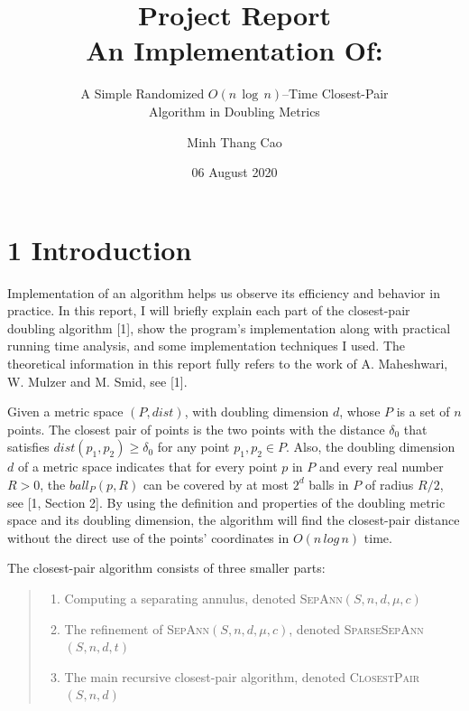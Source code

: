 \documentclass[12pt,english,]{article}
\title{\textbf{Project Report}\\
\Large{An Implementation Of:}}
\subtitle{A Simple Randomized \(O(n\,\log\, n)\)--Time Closest-Pair\\
Algorithm in Doubling Metrics}
\author{Minh Thang Cao}
\date{06 August 2020}
\begin{document}
\maketitle

\hypertarget{section1}{%
\section{\texorpdfstring{1
\enspace Introduction}{1 Introduction}}\label{section1}}

Implementation of an algorithm helps us observe its efficiency and
behavior in practice. In this report, I will briefly explain each part
of the closest-pair doubling algorithm {[}1{]}, show the program's
implementation along with practical running time analysis, and some
implementation techniques I used. The theoretical information in this
report fully refers to the work of A. Maheshwari, W. Mulzer and M. Smid,
see {[}1{]}.

Given a metric space \((P,dist)\), with doubling dimension \(d\), whose
\(P\) is a set of \(n\) points. The closest pair of points is the two
points with the distance \(\delta_0\) that satisfies
\(dist(p_1, p_2) \geq \delta_0\) for any point \(p_1, p_2 \in P\). Also,
the doubling dimension \(d\) of a metric space indicates that for every
point \(p\) in \(P\) and every real number \(R > 0\), the
\(ball_P(p, R)\) can be covered by at most \(2^d\) balls in \(P\) of
radius \(R/2\), see {[}1, Section 2{]}. By using the definition and
properties of the doubling metric space and its doubling dimension, the
algorithm will find the closest-pair distance without the direct use of
the points' coordinates in \(O(n\,log\,n)\) time.

The closest-pair algorithm consists of three smaller parts:

\vspace{-2.5truemm}

\begin{quote}
\begin{enumerate}
\item Computing a separating annulus, denoted \textsc{SepAnn}$(S,n,d,\mu,c)$
\item The refinement of \textsc{SepAnn}$(S,n,d,\mu,c)$, denoted \textsc{SparseSepAnn}$(S,n,d,t)$
\item The main recursive closest-pair algorithm, denoted \textsc{ClosestPair}$(S,n,d)$
\end{enumerate}
\end{quote}
\end{document}
